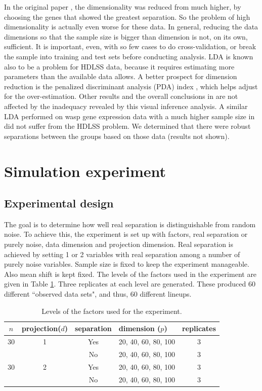 In the original paper \citep{toth:2010}, the dimensionality was reduced from much higher, by choosing the genes that showed the greatest separation. So the problem of high dimensionality is actually even worse for these data. In general, reducing the data dimensions so that the sample size is bigger than dimension is not, on its own, sufficient. It is important, even, with so few cases to do cross-validation, or break the sample into training and test sets before conducting analysis. LDA is known also to be a problem for HDLSS data, because it requires estimating more parameters than the available data allows. A better prospect for dimension reduction is the penalized discriminant analysis (PDA) index \citep{lee:2009}, which helps adjust for the over-estimation. Other results and the overall conclusions in \cite{toth:2010} are not affected by the inadequacy revealed by this visual inference analysis. A similar LDA performed on wasp gene expression data with a much higher sample size in \cite{toth:2007} did not suffer from the HDLSS problem. We determined that there were robust separations between the groups based on those data (results not shown).


\section{Simulation experiment} \label{sec:experiment}

\subsection{Experimental design}

The goal is to determine how well real separation is distinguishable from random noise. To achieve this, the experiment is set up with factors, real separation or purely noise, data dimension and projection dimension. Real separation is achieved by setting 1 or 2 variables with real separation among a number of purely noise variables.  Sample size is fixed to keep the experiment manageable. Also mean shift is kept fixed. The levels of the factors used in the experiment are given in Table \ref{freq}. Three replicates at each level are generated. These produced 60 different ``observed data sets", and thus, 60 different lineups. 

\begin{table}[htbp]
\begin{center}
\caption{Levels of the factors used for the experiment.}
\begin{tabular}{cccp{2.2cm}|c}
  \hline
  \hline
  $n$ & projection($d$) & separation & dimension ($p$) & replicates\\
  \hline
  30 & 1 & Yes & 20, 40, 60, 80, 100 & 3 \\
      & & No & 20, 40, 60, 80, 100 & 3\\
   30 & 2 & Yes & 20, 40, 60, 80, 100 & 3 \\
     & & No & 20, 40, 60, 80, 100 & 3\\   
      \hline
\end{tabular}
\label{freq}
\end{center}
\end{table} 

